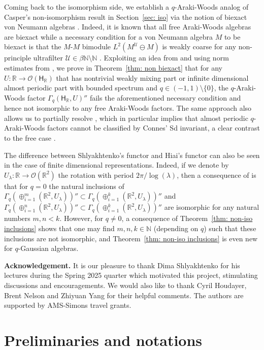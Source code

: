 \documentclass[a4paper,11pt]{amsart}
\theoremstyle{definition}
\newcommand{\N}{{\mathbb N}}
\newcommand{\R}{{\mathbb R}}
\newcommand{\cO}{{\mathcal O}}
\newcommand{\cU}{{\mathcal U}}
\newcommand{\sH}{\mathsf{H}}
\begin{document}
Coming back to the isomorphism side, we establish a $q$-Araki-Woods analog of Casper's non-isomorphism result \cite{Cas23}
	in Section~\ref{sec: iso} via the notion of biexact von Neumann algebras \cite{DP23}.
Indeed, it is known that all free Araki-Woods algebras are biexact \cite{HoIs17, DP23}
	while a necessary condition for a von Neumann algebra $M$ to be biexact is that the
	$M$-$M$ bimodule $L^2(M^\cU\ominus M)$ is weakly coarse for any non-principle ultrafilter $\cU\in \beta\N\setminus\N$
	\cite[Section 7]{DP23}.
Exploiting an idea from \cite{BCKW22} and using norm estimates from \cite{Nou04, Hia03},
	we prove in Theorem~\ref{thm: non biexact} that
	for any $U: \R\to \cO(\sH_\R)$ that has nontrivial weakly mixing part or infinite dimensional almost periodic part with bounded spectrum
	and $q\in (-1,1)\setminus\{0\}$,
	the $q$-Araki-Woods factor $\Gamma_q(\sH_\R, U)''$ fails the aforementioned necessary condition and hence not isomorphic to any free Araki-Woods factors.
The same approach also allows us to partially resolve \cite[Conjecture 2.11]{KSW23},
	which in particular implies that almost periodic $q$-Araki-Woods factors cannot be classified by Connes' Sd invariant,
	a clear contrast to the free case \cite{Sh97}.

The difference between Shlyakhtenko's functor and Hiai's functor can also be seen in the case of finite dimensional representations.
Indeed, if we denote by $U_\lambda: \R\to\cO(\R^2)$ the rotation with period $2\pi/\log(\lambda)$,
	then a consequence of \cite{Sh97} is that for $q=0$
		the natural inclusions of $\Gamma_q(\oplus_{i=1}^m(\R^2, U_\lambda))''\subset \Gamma_q(\oplus_{i=1}^k (\R^2, U_\lambda))''$
		and $\Gamma_q(\oplus_{i=1}^n(\R^2, U_\lambda))'' \subset \Gamma_q(\oplus_{i=1}^k (\R^2, U_\lambda))''$
		are isomorphic for any natural numbers $m,n< k$.
However, for $q\neq 0$, a consequence of Theorem~\ref{thm: non-iso inclusions} shows that
	one may find $m,n,k\in \N$ (depending on $q$)
	such that these inclusions are not isomorphic,
	and Theorem~\ref{thm: non-iso inclusions} is even new for $q$-Gaussian algebras.
	
\textbf{Acknowledgement.} It is our pleasure to thank Dima Shlyakhtenko for
	his lectures during the Spring 2025 quarter which motivated this project, stimulating discussions and encouragements. 
    We would also like to thank Cyril Houdayer, Brent Nelson and Zhiyuan Yang for their helpful comments.
	The authors are supported by AMS-Simons travel grants.
	

\section{Preliminaries and notations}\label{sec: prelim}
\end{document}
